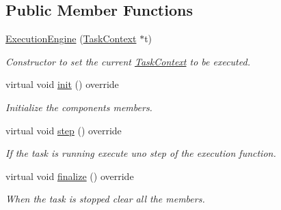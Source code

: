 \subsection*{Public Member Functions}
\begin{DoxyCompactItemize}
\item 
\hypertarget{classcoco_1_1_execution_engine_aa0a33c45c90946986237b0ccc82338ce}{}\hyperlink{classcoco_1_1_execution_engine_aa0a33c45c90946986237b0ccc82338ce}{Execution\+Engine} (\hyperlink{classcoco_1_1_task_context}{Task\+Context} $\ast$t)\label{classcoco_1_1_execution_engine_aa0a33c45c90946986237b0ccc82338ce}

\begin{DoxyCompactList}\small\item\em Constructor to set the current \hyperlink{classcoco_1_1_task_context}{Task\+Context} to be executed. \end{DoxyCompactList}\item 
\hypertarget{classcoco_1_1_execution_engine_a99ee8574a588ae8fa647bbca9f314fbd}{}virtual void \hyperlink{classcoco_1_1_execution_engine_a99ee8574a588ae8fa647bbca9f314fbd}{init} () override\label{classcoco_1_1_execution_engine_a99ee8574a588ae8fa647bbca9f314fbd}

\begin{DoxyCompactList}\small\item\em Initialize the components members. \end{DoxyCompactList}\item 
\hypertarget{classcoco_1_1_execution_engine_a9c3cfba8051944ac90a12bae7baf99c3}{}virtual void \hyperlink{classcoco_1_1_execution_engine_a9c3cfba8051944ac90a12bae7baf99c3}{step} () override\label{classcoco_1_1_execution_engine_a9c3cfba8051944ac90a12bae7baf99c3}

\begin{DoxyCompactList}\small\item\em If the task is running execute uno step of the execution function. \end{DoxyCompactList}\item 
\hypertarget{classcoco_1_1_execution_engine_a5375d0bb4a83c1c4142ea9907220c4c7}{}virtual void \hyperlink{classcoco_1_1_execution_engine_a5375d0bb4a83c1c4142ea9907220c4c7}{finalize} () override\label{classcoco_1_1_execution_engine_a5375d0bb4a83c1c4142ea9907220c4c7}

\begin{DoxyCompactList}\small\item\em When the task is stopped clear all the members. \end{DoxyCompactList}\end{DoxyCompactItemize}
